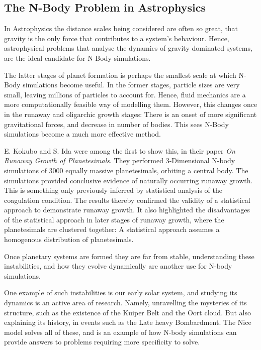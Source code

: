 \documentclass[a4paper,10pt]{article}
\begin{document}
\subsection{The N-Body Problem in Astrophysics}

In Astrophysics the distance scales being considered are often so great, that gravity is the only force that contributes to a system's behaviour. Hence, astrophysical problems that analyse the dynamics of gravity dominated systems, are the ideal candidate for N-Body simulations.

The latter stages of planet formation is perhaps the smallest scale at which N-Body simulations become useful. In the former stages, particle sizes are very small, leaving millions of particles to account for. Hence, fluid mechanics are a more computationally feasible way of modelling them. However, this changes once in the runaway and oligarchic growth stages: There is an onset of more significant gravitational forces, and decrease in number of bodies. This sees N-Body simulations become a much more effective method. 

E. Kokubo and S. Ida were among the first to show this, in their paper \textit{On Runaway Growth of Planetesimals}\cite{Runaway}. They performed 3-Dimensional N-body simulations of 3000 equally massive planetesimals, orbiting a central body. The simulations provided conclusive evidence of naturally occurring runaway growth. This is something only previously inferred by statistical analysis of the coagulation condition\cite{Statistics,Coagulation}. The results thereby confirmed the validity of a statistical approach to demonstrate runaway growth. It also highlighted the disadvantages of the statistical approach in later stages of runaway growth, where the planetesimals are clustered together: A statistical approach assumes a homogenous distribution of planetesimals.

Once planetary systems are formed they are far from stable, understanding these instabilities, and how they evolve dynamically are another use for N-body simulations. 

One example of such instabilities is our early solar system, and studying its dynamics is an active area of research. Namely, unravelling the mysteries of its structure, such as the existence of the Kuiper Belt and the Oort cloud. But also explaining its history, in events such as the Late heavy Bombardment. The Nice model solves all of these, and is an example of how N-body simulations can provide answers to problems requiring more specificity to solve. 
\end{document}
